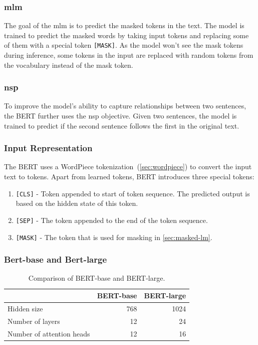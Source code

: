 \subsubsection{\acl{mlm}}
\label{sec:masked-lm}
The goal of the \ac{mlm} is to predict the masked tokens in the text.
The model is trained to predict the masked words by taking input tokens and replacing some of them with a special token \verb|[MASK]|.
As the model won't see the mask tokens during inference, some tokens in the input are replaced with random tokens from the vocabulary instead of the mask token.

\subsubsection{\acl{nsp}}
To improve the model's ability to capture relationships between two sentences,
the BERT further uses the \acf{nsp} objective.
Given two sentences, the model is trained to predict if the second sentence follows the first in the original text.

\subsubsection{Input Representation}
The BERT uses a WordPiece tokenization~(\autoref{sec:wordpiece}) to convert the input text to tokens.
Apart from learned tokens, BERT introduces three special tokens:
\begin{enumerate}
    \item \verb|[CLS]| - Token appended to start of token sequence. The predicted output is based on the hidden state of this token.
    \item \verb|[SEP]| - The token appended to the end of the token sequence.
    \item \verb|[MASK]| - The token that is used for masking in \autoref{sec:masked-lm}.
\end{enumerate}


\subsubsection{Bert-base and Bert-large}
\begin{table}[h]
    \centering\footnotesize\sf
    \begin{tabular}{lrr}
        \toprule
        {}                        & BERT-base & BERT-large \\
        \midrule
        Hidden size               & 768       & 1024       \\
        Number of layers          & 12        & 24         \\
        Number of attention heads & 12        & 16         \\
        \bottomrule
    \end{tabular}
    \caption{Comparison of BERT-base and BERT-large.}
    \label{tab:bert-base-large}
\end{table}

